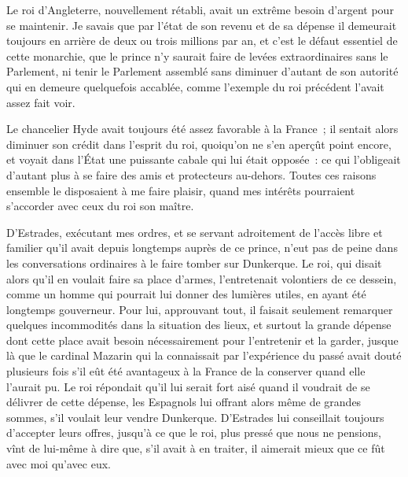 \documentclass[french,twoside]{book} %
\begin{document}
Le roi d’Angleterre, nouvellement rétabli, avait un extrême besoin d’argent pour se maintenir. Je savais que par l’état de son revenu et de sa dépense il demeurait toujours en arrière de deux ou trois millions par an, et c’est le défaut essentiel de cette monarchie, que le prince n’y saurait faire de levées extraordinaires sans le Parlement, ni tenir le Parlement assemblé sans diminuer d’autant de son autorité qui en demeure quelquefois accablée, comme l’exemple du roi précédent l’avait assez fait voir.\par
Le chancelier Hyde avait toujours été assez favorable à la France ; il sentait alors diminuer son crédit dans l’esprit du roi, quoiqu’on ne s’en aperçût point encore, et voyait dans l’État une puissante cabale qui lui était opposée : ce qui l’obligeait d’autant plus à se faire des amis et protecteurs au-dehors. Toutes ces raisons ensemble le disposaient à me faire plaisir, quand mes intérêts pourraient s’accorder avec ceux du roi son maître.\par
D’Estrades, exécutant mes ordres, et se servant adroitement de l’accès libre et familier qu’il avait depuis longtemps auprès de ce prince, n’eut pas de peine dans les conversations ordinaires à le faire tomber sur Dunkerque. Le roi, qui disait alors qu’il en voulait faire sa place d’armes, l’entretenait volontiers de ce dessein, comme un homme qui pourrait lui donner des lumières utiles, en ayant été longtemps gouverneur. Pour lui, approuvant tout, il faisait seulement remarquer quelques incommodités dans la situation des lieux, et surtout la grande dépense dont cette place avait besoin nécessairement pour l’entretenir et la garder, jusque là que le cardinal Mazarin qui la connaissait par l’expérience du passé avait douté plusieurs fois s’il eût été avantageux à la France de la conserver quand elle l’aurait pu. Le roi répondait qu’il lui serait fort aisé quand il voudrait de se délivrer de cette dépense, les Espagnols lui offrant alors même de grandes sommes, s’il voulait leur vendre Dunkerque. D’Estrades lui conseillait toujours d’accepter leurs offres, jusqu’à ce que le roi, plus pressé que nous ne pensions, vînt de lui-même à dire que, s’il avait à en traiter, il aimerait mieux que ce fût avec moi qu’avec eux.\par
\end{document}
